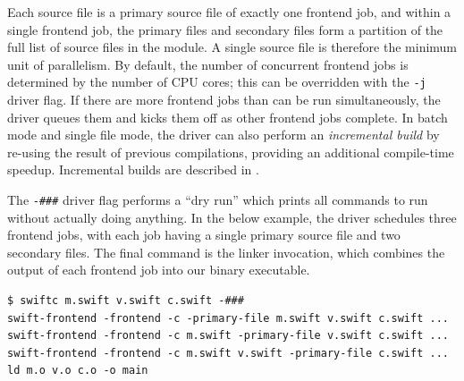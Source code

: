 \documentclass[../generics]{subfiles}
\begin{document}
Each source file is a primary source file of exactly one frontend job, and within a single frontend job, the primary files and secondary files form a partition of the full list of source files in the module. A single source file is therefore the minimum unit of parallelism. By default, the number of concurrent frontend jobs is determined by the number of CPU cores; this can be overridden with the \texttt{-j} driver flag. If there are more frontend jobs than can be run simultaneously, the driver queues them and kicks them off as other frontend jobs complete. In batch mode and single file mode, the driver can also perform an \emph{incremental build} by re-using the result of previous compilations, providing an additional compile-time speedup. Incremental builds are described in .

The \verb|-###| driver flag performs a ``dry run'' which prints all commands to run without actually doing anything. In the below example, the driver schedules three frontend jobs, with each job having a single primary source file and two secondary files. The final command is the linker invocation, which combines the output of each frontend job into our binary executable.
\begin{Verbatim}
$ swiftc m.swift v.swift c.swift -###
swift-frontend -frontend -c -primary-file m.swift v.swift c.swift ...
swift-frontend -frontend -c m.swift -primary-file v.swift c.swift ...
swift-frontend -frontend -c m.swift v.swift -primary-file c.swift ...
ld m.o v.o c.o -o main
\end{Verbatim}
\end{document}

